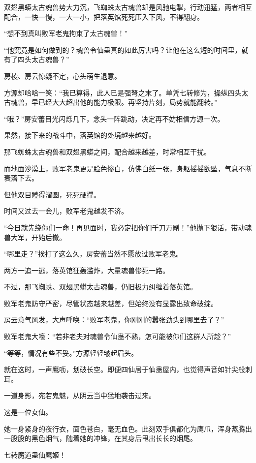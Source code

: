 \begin{this_body}
双翅黑蟒太古魂兽势大力沉，飞蜘蛛太古魂兽却是风驰电掣，行动迅猛，两者相互配合，一快一慢，一大一小，把落英馆死死压入下风，不得翻身。

“想不到真叫败军老鬼拘束了太古魂兽！”

“他究竟是如何做到的？魂兽令仙蛊真的如此厉害吗？让他在这么短的时间里，就有了四头太古魂兽？”

房棱、房云惊疑不定，心头萌生退意。

方源却哈哈一笑：“我已算得，此人已是强弩之末了。单凭七转修为，操纵四头太古魂兽，早已经大大超出他的能力极限。再坚持片刻，局势就能翻转。”

“哦？”房安蕾目光闪烁几下，念头一阵跳动，决定再不妨相信方源一次。

果然，接下来的战斗中，落英馆的处境越来越好。

那飞蜘蛛太古魂兽和双翅黑蟒之间，配合越来越差，时常相互干扰。

而地面沙漠上，败军老鬼更是脸色惨白，仿佛白纸一张，身躯摇摇欲坠，气息不断衰落下去。

但他双目瞪得溜圆，死死硬撑。

时间又过去一会儿，败军老鬼越发不济。

“今日就先绕你们一命！再见面时，我必定把你们千刀万剐！”他抛下狠话，带动魂兽大军，开始后撤。

“哪里走？”挨打了这么久，房安蕾当然不愿放过败军老鬼。

两方一追一逃，落英馆狂轰滥炸，大量魂兽惨死一路。

不过，那飞蜘蛛、双翅黑蟒太古魂兽，仍旧极力纠缠着落英馆。

败军老鬼防守严密，尽管状态越来越差，但始终没有显露出致命破绽。

房云意气风发，大声呼唤：“败军老鬼，你刚刚的嚣张劲头到哪里去了？”

败军老鬼大嚎：“若非老夫对魂兽令仙蛊不熟，怎可能被你们这群人所趁？”

“等等，情况有些不妥。”方源轻轻皱起眉头。

就在这时，一声鹰呖，划破长空。即便四仙居于仙蛊屋内，也觉得声音如针尖般刺耳。

一道身影，宛若鬼魅，从阴云当中猛地袭击过来。

这是一位女仙。

她一身紧身的夜行衣，面色苍白，毫无血色。此刻双手俱都化为鹰爪，浑身蒸腾出一股股的黑色烟气，随着她的冲锋，在其身后甩出长长的烟尾。

七转魔道蛊仙鹰姬！


\end{this_body}
